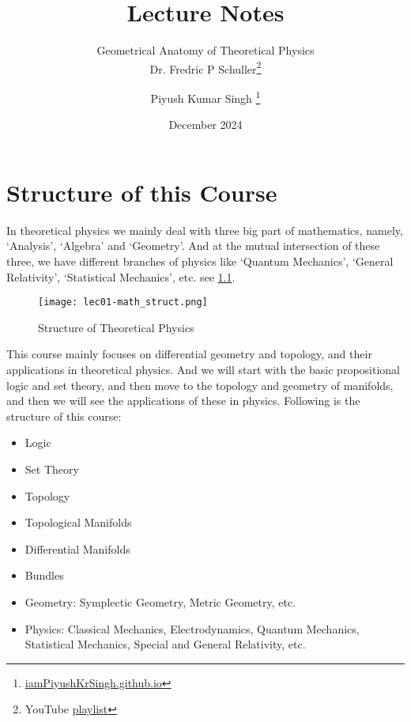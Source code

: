 \documentclass[11pt, oneside, parskip=half-]{scrbook}
\title{
    \Huge Lecture Notes
}
\subtitle{
    \huge Geometrical Anatomy of Theoretical Physics \\[10pt]
    \LARGE\normalfont\sffamily Dr. Fredric P Schuller\thanks{YouTube \href{https://youtube.com/playlist?list=PLPH7f_7ZlzxTi6kS4vCmv4ZKm9u8g5yic&si=Uy5ciENkuiTlvx6X}{playlist}}
}
\author{
\Large Piyush Kumar Singh \thanks{{\href{https://iampiyushkrsingh.github.io}{iamPiyushKrSingh.github.io}}}
}
\date{
    \large December 2024
}
\newcommand{\0}{\emptyset}
\begin{document}
\frontmatter
\begin{titlepage}
    \let\newpage\relax
    \singhtitle
\end{titlepage}

\chapter{Structure of this Course}
\noindent In theoretical physics we mainly deal with three big part of mathematics, namely, `Analysis', `Algebra' and `Geometry'. And at the mutual intersection of these three, we have different branches of physics like `Quantum Mechanics', `General Relativity', `Statistical Mechanics', etc. see \cref{fig:structure}.

\begin{figure}[H]
    \centering
    \texttt{[image: lec01-math\_struct.png]}
    \caption{Structure of Theoretical Physics}
    \label{fig:structure}
\end{figure}\noindent
This course mainly focuses on differential geometry and topology, and their applications in theoretical physics. And we will start with the basic propositional logic and set theory, and then move to the topology and geometry of manifolds, and then we will see the applications of these in physics. Following is the structure of this course:

\begin{itemize}
    \item Logic
    \item Set Theory
    \item Topology
    \item Topological Manifolds
    \item Differential Manifolds
    \item Bundles
    \item Geometry: Symplectic Geometry, Metric Geometry, etc.
    \item Physics: Classical Mechanics, Electrodynamics, Quantum Mechanics, Statistical Mechanics, Special and General Relativity, etc.
\end{itemize}


\tableofcontents
{}

\mainmatter

% 

% 

% 


\end{document}
